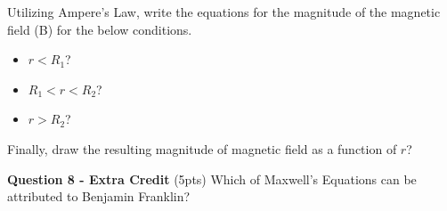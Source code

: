 \documentclass[14pt]{report}
\begin{document}
Utilizing Ampere's Law, write the equations for the magnitude of the magnetic field (B) for the below conditions. 

\begin{itemize}
\item $r < R_1$?
\item $R_1 < r < R_2$?
\item $r > R_2$?
\end{itemize}

Finally, draw the resulting magnitude of magnetic field as a function of $r$?

\textbf{Question 8 - Extra Credit} (5pts)
Which of Maxwell's Equations can be attributed to Benjamin Franklin?
 
\end{document}
